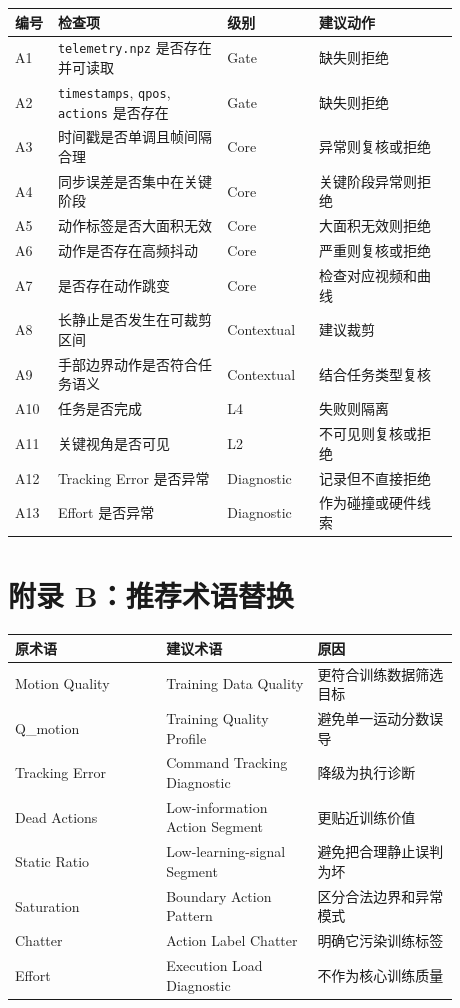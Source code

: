 \documentclass[UTF8,zihao=-4]{ctexart}
\begin{document}
\begin{longtable}{p{0.08\linewidth}p{0.34\linewidth}p{0.18\linewidth}p{0.28\linewidth}}
\toprule
\textbf{编号} & \textbf{检查项} & \textbf{级别} & \textbf{建议动作} \\
\midrule
A1 & \texttt{telemetry.npz} 是否存在并可读取 & Gate & 缺失则拒绝 \\
A2 & \texttt{timestamps}, \texttt{qpos}, \texttt{actions} 是否存在 & Gate & 缺失则拒绝 \\
A3 & 时间戳是否单调且帧间隔合理 & Core & 异常则复核或拒绝 \\
A4 & 同步误差是否集中在关键阶段 & Core & 关键阶段异常则拒绝 \\
A5 & 动作标签是否大面积无效 & Core & 大面积无效则拒绝 \\
A6 & 动作是否存在高频抖动 & Core & 严重则复核或拒绝 \\
A7 & 是否存在动作跳变 & Core & 检查对应视频和曲线 \\
A8 & 长静止是否发生在可裁剪区间 & Contextual & 建议裁剪 \\
A9 & 手部边界动作是否符合任务语义 & Contextual & 结合任务类型复核 \\
A10 & 任务是否完成 & L4 & 失败则隔离 \\
A11 & 关键视角是否可见 & L2 & 不可见则复核或拒绝 \\
A12 & Tracking Error 是否异常 & Diagnostic & 记录但不直接拒绝 \\
A13 & Effort 是否异常 & Diagnostic & 作为碰撞或硬件线索 \\
\bottomrule
\end{longtable}

\section{附录 B：推荐术语替换}

\begin{longtable}{p{0.3\linewidth}p{0.3\linewidth}p{0.28\linewidth}}
\toprule
\textbf{原术语} & \textbf{建议术语} & \textbf{原因} \\
\midrule
Motion Quality & Training Data Quality & 更符合训练数据筛选目标 \\
Q\_motion & Training Quality Profile & 避免单一运动分数误导 \\
Tracking Error & Command Tracking Diagnostic & 降级为执行诊断 \\
Dead Actions & Low-information Action Segment & 更贴近训练价值 \\
Static Ratio & Low-learning-signal Segment & 避免把合理静止误判为坏 \\
Saturation & Boundary Action Pattern & 区分合法边界和异常模式 \\
Chatter & Action Label Chatter & 明确它污染训练标签 \\
Effort & Execution Load Diagnostic & 不作为核心训练质量 \\
\bottomrule
\end{longtable}
\end{document}
